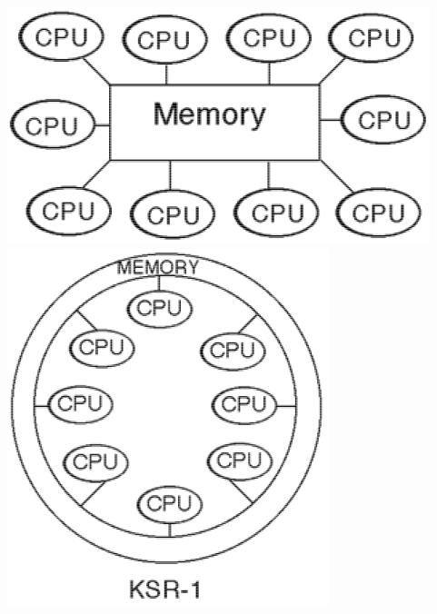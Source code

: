 \documentclass[12pt, a4paper]{book}
\begin{document}
\begin{minipage}{0.3\linewidth}
    \includegraphics[width=0.99\linewidth]{figures/shared-memory01.png}
    \includegraphics[width=0.99\linewidth]{figures/shared-memory02.png}
\end{minipage}
\end{document}
